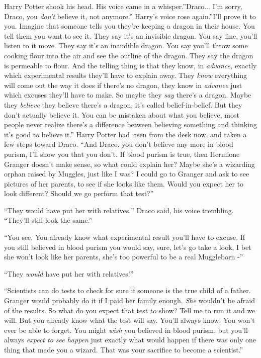 Harry Potter shook his head. His voice came in a whisper.''Draco...
I'm sorry, Draco, you \emph{don't} believe it, not anymore.'' Harry's
voice rose again.''I'll prove it to you. Imagine that someone tells you
they're keeping a dragon in their house. You tell them you want to see
it. They say it's an invisible dragon. You say fine, you'll listen to it
move. They say it's an inaudible dragon. You say you'll throw some
cooking flour into the air and see the outline of the dragon. They say
the dragon is permeable to flour. And the telling thing is that they
know, in \emph{advance,} exactly which experimental results they'll have
to explain away. They \emph{know} everything will come out the way it
does if there's no dragon, they know in \emph{advance} just which
excuses they'll have to make. So maybe they \emph{say} there's a dragon.
Maybe they \emph{believe} they believe there's a dragon, it's called
belief-in-belief. But they don't actually believe it. You can be
mistaken about what you believe, most people never realize there's a
difference between believing something and thinking it's good to believe
it.'' Harry Potter had risen from the desk now, and taken a few steps
toward Draco. ``And Draco, you don't believe any more in blood purism,
I'll show you that you don't. If blood purism is true, then Hermione
Granger doesn't make sense, so what could explain her? Maybe she's a
wizarding orphan raised by Muggles, just like I was? I could go to
Granger and ask to see pictures of her parents, to see if she looks like
them. Would you expect her to look different? Should we go perform that
test?''

``They would have put her with relatives,'' Draco said, his voice
trembling. ``They'll still look the same.''

``You see. You already know what experimental result you'll have to
excuse. If you still believed in blood purism you would say, sure, let's
go take a look, I bet she won't look like her parents, she's too
powerful to be a real Muggleborn -''

``They \emph{would} have put her with relatives!''

``Scientists can do tests to check for sure if someone is the true child
of a father. Granger would probably do it if I paid her family enough.
\emph{She} wouldn't be afraid of the results. So what do you expect that
test to show? Tell me to run it and we will. But you already know what
the test will say. You'll always know. You won't ever be able to forget.
You might \emph{wish} you believed in blood purism, but you'll always
\emph{expect to see happen} just exactly what would happen if there was
only one thing that made you a wizard. That was your sacrifice to become
a scientist.''

